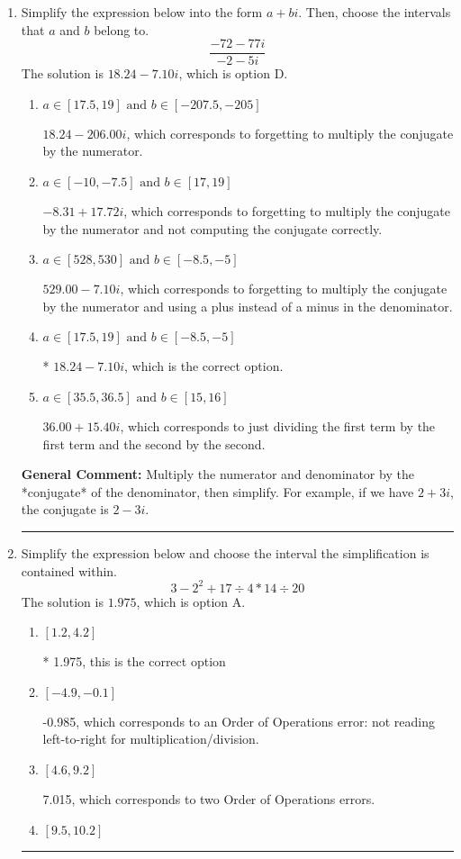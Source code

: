 \documentclass{extbook}[14pt]
\newcommand{\litem}[1]{\item #1

\rule{\textwidth}{0.4pt}}
\begin{document}
\begin{enumerate}\litem{
Simplify the expression below into the form $a+bi$. Then, choose the intervals that $a$ and $b$ belong to.
\[ \frac{-72 - 77 i}{-2 - 5 i} \]The solution is \( 18.24  - 7.10 i \), which is option D.\begin{enumerate}[label=\Alph*.]
\item \( a \in [17.5, 19] \text{ and } b \in [-207.5, -205] \)

 $18.24  - 206.00 i$, which corresponds to forgetting to multiply the conjugate by the numerator.
\item \( a \in [-10, -7.5] \text{ and } b \in [17, 19] \)

 $-8.31  + 17.72 i$, which corresponds to forgetting to multiply the conjugate by the numerator and not computing the conjugate correctly.
\item \( a \in [528, 530] \text{ and } b \in [-8.5, -5] \)

 $529.00  - 7.10 i$, which corresponds to forgetting to multiply the conjugate by the numerator and using a plus instead of a minus in the denominator.
\item \( a \in [17.5, 19] \text{ and } b \in [-8.5, -5] \)

* $18.24  - 7.10 i$, which is the correct option.
\item \( a \in [35.5, 36.5] \text{ and } b \in [15, 16] \)

 $36.00  + 15.40 i$, which corresponds to just dividing the first term by the first term and the second by the second.
\end{enumerate}

\textbf{General Comment:} Multiply the numerator and denominator by the *conjugate* of the denominator, then simplify. For example, if we have $2+3i$, the conjugate is $2-3i$.
}
\litem{
Simplify the expression below and choose the interval the simplification is contained within.
\[ 3 - 2^2 + 17 \div 4 * 14 \div 20 \]The solution is \( 1.975 \), which is option A.\begin{enumerate}[label=\Alph*.]
\item \( [1.2, 4.2] \)

* 1.975, this is the correct option
\item \( [-4.9, -0.1] \)

 -0.985, which corresponds to an Order of Operations error: not reading left-to-right for multiplication/division.
\item \( [4.6, 9.2] \)

 7.015, which corresponds to two Order of Operations errors.
\item \( [9.5, 10.2] \)


\end{enumerate}}
\end{enumerate}
\end{document}

